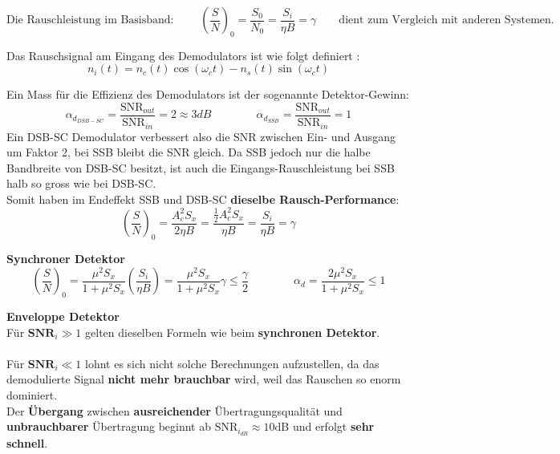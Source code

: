$$ \text{Die Rauschleistung im Basisband: } \qquad \boxed{\left(\dfrac{S}{N}\right)_0 =
\dfrac{S_0}{N_0} = \dfrac{S_i}{\eta B} = \gamma} \qquad \text{dient zum Vergleich mit anderen
Systemen.}$$

\begin{figure}[!ht]
\begin{center}
	
\end{center}
\end{figure}
Das Rauschsignal am Eingang des Demodulators ist wie folgt definiert
:  
$$n_i(t) = n_c(t) \cos(\omega_c t) - n_s(t) \sin(\omega_c t) $$


Ein Mass für die Effizienz des Demodulators ist der sogenannte Detektor-Gewinn: \\
$$ \alpha_{d_{DSB-SC}} = \dfrac{\text{SNR}_{out}}{\text{SNR}_{in}} = 2 \approx 3 dB
\qquad \qquad
 \alpha_{d_{SSB}} = \dfrac{\text{SNR}_{out}}{\text{SNR}_{in}} = 1
$$
Ein DSB-SC Demodulator verbessert also die SNR zwischen Ein- und Ausgang um Faktor 2, bei SSB
bleibt die SNR gleich. Da SSB jedoch nur die halbe Bandbreite von DSB-SC besitzt, ist auch die
Eingangs-Rauschleistung bei SSB halb so gross wie bei DSB-SC. \\
Somit haben im Endeffekt SSB und DSB-SC \textbf{dieselbe Rausch-Performance}: 
	$$ \left(\dfrac{S}{N}\right)_0 =
	\dfrac{A_c^2 S_x}{2 \eta B} = \dfrac{\frac12 A_c^2 S_x}{\eta B} = \dfrac{S_i}{\eta B} = \gamma $$


\textbf{Synchroner Detektor}
$$ \left(\dfrac{S}{N}\right)_0 =
\dfrac{\mu^2 S_x}{1 + \mu^2 S_x} \left(\dfrac{S_i}{\eta B}\right) = \dfrac{\mu^2 S_x}{1 + \mu^2
S_x} \gamma \leq \dfrac{\gamma}{2} \qquad \qquad
\alpha_d = \dfrac{2 \mu^2 S_x}{1 + \mu^2 S_x} \leq 1$$


\textbf{Enveloppe Detektor} \\
Für \boldmath$ \textbf{SNR}_i \gg 1 $ gelten dieselben Formeln wie beim \textbf{synchronen
Detektor}. \\ \\ Für \boldmath$ \textbf{SNR}_i \ll 1 $ lohnt es sich nicht solche
Berechnungen aufzustellen, da das demodulierte Signal \textbf{nicht mehr brauchbar} wird, weil das Rauschen so enorm dominiert. \\
Der \textbf{Übergang} zwischen \textbf{ausreichender} Übertragungsqualität und \textbf{unbrauchbarer}  
Übertragung beginnt ab \unboldmath$ \text{SNR}_{i_{dB}} \approx 10 \text{dB} $ und erfolgt
\textbf{sehr schnell}.

